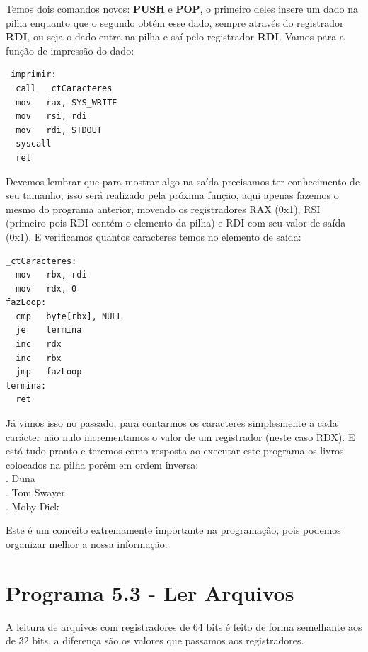 Temos dois comandos novos: \textbf{PUSH} e \textbf{POP}, o primeiro deles insere um dado na pilha enquanto que o segundo obtém esse dado, sempre através do registrador \textbf{RDI}, ou seja o dado entra na pilha e saí pelo registrador \textbf{RDI}. Vamos para a função de impressão do dado:
\begin{lstlisting}[]
_imprimir:
  call  _ctCaracteres
  mov   rax, SYS_WRITE
  mov   rsi, rdi
  mov   rdi, STDOUT
  syscall
  ret
\end{lstlisting}

Devemos lembrar que para mostrar algo na saída precisamos ter conhecimento de seu tamanho, isso será realizado pela próxima função, aqui apenas fazemos o mesmo do programa anterior, movendo os registradores RAX (0x1), RSI (primeiro pois RDI contém o elemento da pilha) e RDI com seu valor de saída (0x1). E verificamos quantos caracteres temos no elemento de saída:
\begin{lstlisting}[]
_ctCaracteres:
  mov   rbx, rdi
  mov   rdx, 0
fazLoop:
  cmp   byte[rbx], NULL
  je    termina
  inc   rdx
  inc   rbx
  jmp   fazLoop
termina:
  ret 
\end{lstlisting}

Já vimos isso no passado, para contarmos os caracteres simplesmente a cada carácter não nulo incrementamos o valor de um registrador (neste caso RDX). E está tudo pronto e teremos como resposta ao executar este programa os livros colocados na pilha porém em ordem inversa: \\
{. Duna} \\
{. Tom Swayer} \\
{. Moby Dick}

Este é um conceito extremamente importante na programação, pois podemos organizar melhor a nossa informação.

\section{Programa 5.3 - Ler Arquivos}
A leitura de arquivos com registradores de 64 bits é feito de forma semelhante aos de 32 bits, a diferença são os valores que passamos aos registradores. 

